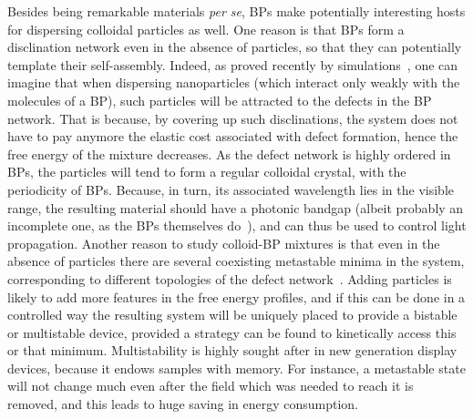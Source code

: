 \documentclass[12pt]{article}
\begin{document}


Besides being remarkable materials {\it per se}, BPs make potentially
interesting hosts for dispersing colloidal particles as well. One reason
is that BPs form a disclination network even in the absence of
particles, so that they can potentially template their self-assembly. 
Indeed, as proved recently by simulations~\cite{miha}, one can imagine that 
when dispersing nanoparticles (which interact only weakly with the molecules
of a BP), such particles will be attracted to the defects in the BP
network. That is because, by covering up such disclinations, 
the system does not have to pay anymore the elastic cost associated with
defect formation, hence the free energy of the mixture decreases.
As the defect network is highly ordered in BPs, the particles will tend
to form a regular colloidal crystal, with the periodicity of BPs. 
Because, in turn, its associated wavelength lies in the visible range, 
the resulting material should have a photonic bandgap (albeit probably
an incomplete one, as the BPs themselves do~\cite{bplasers}), and can thus be used to 
control light propagation.
Another reason to study colloid-BP mixtures is that even in the absence
of particles there are several coexisting metastable minima in the system,
corresponding to different topologies of the defect network~\cite{adriano}. 
Adding particles
is likely to add more features in the free energy profiles, and if this
can be done in a controlled way the resulting system will be uniquely
placed to provide a bistable or multistable device, provided a strategy
can be found to kinetically access this or that minimum. Multistability
is highly sought after in new generation display devices, because it
endows samples with memory. For instance, a metastable state will not
change much even after the field which was needed to reach it is removed,
and this leads to huge saving in energy consumption. 

\end{document}
